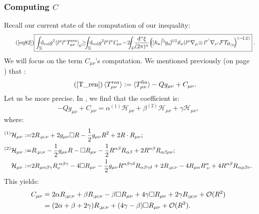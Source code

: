 \documentclass[a4paper,11pt]{article}
\numberwithin{equation}{section}
\theoremstyle{definition}
\renewcommand{\d}{{\mathrm{d}}}
\begin{document}
\subsubsection{Computing $C$}
Recall our current state of the computation of our inequality:
\begin{equation}\tag{\ref{eq82}}
    \boxed{\int_\Sigma \!\!\!\d_\mathrm{vol} g^2 \!\braket{l^\mu l^\nu T^\mathrm{ren}_{\mu\nu}}_{\!\psi} \!\!\geq\!\!\! \int_\Sigma \!\!\!\d_\mathrm{vol} g^2l^\mu l^\nu C_{\!\mu\nu}\!-\!2\!\!\!\int_D\!\!\frac{\d^n\xi}{(2\pi)^n}\!\left(\!\!(|h_\kappa|^{\!^1\!\!/_{\!4}}\!g_\kappa\!)^{\!\otimes 2}\vartheta_\kappa(l^\mu\nabla_\mu\!\otimes l^{\nu'}\nabla_{\nu'}\mathcal{FT}_{\!\!H_{(2)}}\!\!\right)^{(-\xi,\xi)}}\;.\!\!\!
\end{equation}
We will focus on the term $C_{\mu\nu}$'s computation. We mentioned previously (on page \pageref{T_ren}) that :
\begin{equation}\tag{\ref{T_ren}}
    \braket{T^\mathrm{ren}_{\mu\nu}}:=\braket{T^\mathrm{fin}_{\mu\nu}}-Qg_{\mu\nu} + C_{\mu\nu}.
    \end{equation}
Let us be more precise. In \cite{QFTCurv}, we find that the coefficient is:
\begin{equation}
    -Qg_{\mu\nu}+C_{\mu\nu}=\alpha^{(1)}\mathcal{H}_{\mu\nu}+\beta^{(2)}\mathcal{H}_{\mu\nu}+\gamma\mathcal{H}_{\mu\nu},
\end{equation}
where:
\begin{align}
    ^{(1)}\mathcal{H}_{\mu\nu}:=& 2R_{;\mu;\nu}+ 2g_{\mu\nu}\square R - \frac{1}{2}g_{\mu\nu} R^2 + 2 R\cdot R_{\mu\nu}\notag;\\
    ^{(2)}\mathcal{H}_{\mu\nu}:=& R_{;\mu;\nu} - \frac{1}{2}g_{\mu\nu}R-\square R_{\mu\nu} -\frac{1}{2} R^{\alpha\beta}R_{\alpha\beta}+2R^{\alpha\beta}R_{\alpha\beta\mu\nu};\\
    \mathcal{H}_{\mu\nu}:=& 2R_{\mu\alpha\beta\gamma}R_\nu^{\;\alpha\beta\gamma}-4\square R_{\mu\nu} -\frac{1}{2}g_{\mu\nu}R^{\alpha\beta\gamma\delta}R_{\alpha\beta\gamma\delta} + 2 R_{;\mu;\nu} - 4 R_{\mu\alpha}R^{\alpha}_{\;\nu}+4R^{\alpha\beta}R_{\alpha\mu\beta\nu}\notag.
\end{align}
This yields:
\begin{align}
    C_{\mu\nu} &= 2\alpha R_{;\mu;\nu} + \beta R_{;\mu;\nu} - \beta\square R_{\mu\nu} +4\gamma \square R_{\mu\nu} + 2\gamma R_{;\mu;\nu} + \mathcal{O}(R^2)\notag\\
    &= (2\alpha + \beta + 2\gamma) R_{;\mu;\nu} +(4\gamma- \beta)\square R_{\mu\nu} + \mathcal{O}(R^2) \label{C=A+B}.
\end{align}
\end{document}

